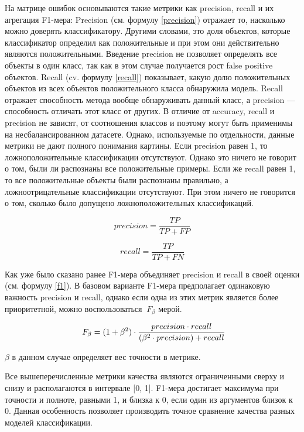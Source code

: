 \documentclass[a4paper,12pt]{extarticle}
\begin{document}
На матрице ошибок основываются такие метрики как precision, recall и их агрегация F1-мера: Precision (см. формулу \ref{precision}) отражает то, насколько можно доверять классификатору. Другими словами, это доля объектов, которые классификатор определил как положительные и при этом они действительно являются положительными. Введение precision не позволяет определять все объекты в один класс, так как в этом случае получается рост false positive объектов. Recall (cv. формулу \ref{recall}) показывает, какую долю положительных объектов из всех объектов положительного класса обнаружила модель. Recall отражает способность метода вообще обнаруживать данный класс, а precision — способность отличать этот класс от других. В отличие от accuracy, recall и precision не зависят, от соотношения классов и поэтому могут быть применимы на несбалансированном датасете. Однако, используемые по отдельности, данные метрики не дают полного понимания картины. Если precision равен 1, то ложноположительные классификации отсутствуют. Однако это ничего не говорит о том, были ли распознаны все положительные примеры. Если же recall равен 1, то все положительные объекты были распознаны правильно, а ложноотрицательные классификации отсутствуют. При этом ничего не говорится о том, сколько было допущено ложноположительных классификаций.

\begin{equation}
	\label{precision}
	precision = \frac{TP}{TP + FP}
\end{equation}

\begin{equation}
	\label{recall}
	recall = \frac{TP}{TP + FN}
\end{equation}


Как уже было сказано ранее F1-мера объединяет precision и recall в своей оценки (см. формулу \ref{f1}). В базовом варианте F1-мера предполагает одинаковую важность precision и recall, однако если одна из этих метрик является более приоритетной, можно воспользоваться $\ F_\beta$ мерой.

\begin{equation}
	\label{f1}
	\large \ F_\beta = (1 + \beta^2) \cdot \frac{precision \cdot recall}{(\beta^2 \cdot precision) + recall}
\end{equation}

$\beta$ в данном случае определяет вес точности в метрике. 

Все вышеперечисленные метрики качества являются ограниченными сверху и снизу и располагаются в интервале [0, 1]. F1-мера достигает максимума при точности и полноте, равными 1, и близка к 0, если один из аргументов близок к 0. Данная особенность позволяет производить точное сравнение качества разных моделей классификации.
\end{document}
